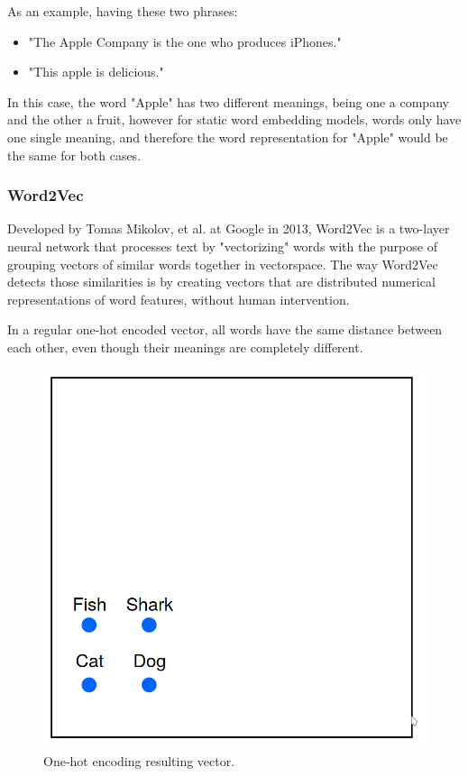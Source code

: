     \par As an example, having these two phrases:

    \begin{itemize}
        \item "The Apple Company is the one who produces iPhones."
        \item "This apple is delicious."
    \end{itemize}

    \par In this case, the word "Apple" has two different meanings, being one a company and the other a fruit, however for static word embedding models, words only have one single meaning, and therefore  the word representation for "Apple" would be the same for both cases. \cite{Batista2018}

   
        \subsubsection{Word2Vec}

        \par Developed by Tomas Mikolov, et al. at Google in 2013, Word2Vec is a two-layer neural network that processes text by "vectorizing" words with the purpose of grouping vectors of similar words together in vectorspace. The way Word2Vec detects those similarities is by creating vectors that are distributed numerical representations of word features, without human intervention.


        \par In a regular one-hot encoded vector, all words have the same distance between each other, even though their meanings are completely different.

        \begin{figure}[htb]
            \centering
            \includegraphics[scale = 0.1]{Sections/3StateOfTheArt/3_images/one_hot_ex.png}
            \caption{One-hot encoding resulting vector. \cite{word2vec_explained}} 
        \end{figure}


